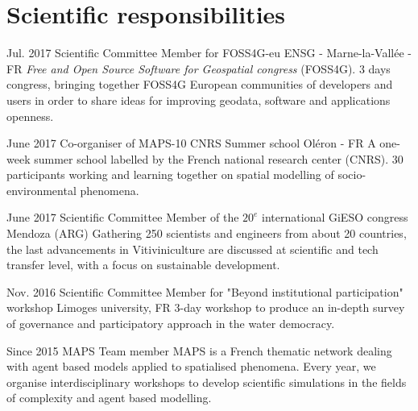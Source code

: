 \documentclass[]{cv-etienne}
\begin{document}
\section{Scientific responsibilities}
\begin{entrylist}
\entry
{Jul. 2017}
{Scientific Committee Member for FOSS4G-eu}
{ENSG - Marne-la-Vallée - FR}
{\emph{Free and Open Source Software for Geospatial congress} (FOSS4G). 3 days congress, bringing together FOSS4G European communities of developers and users in order to share ideas for improving geodata, software and applications openness.}
\end{entrylist}
\begin{entrylist}
\entry
{June 2017}
{Co-organiser of MAPS-10 CNRS Summer school}
{Oléron - FR}
{A one-week summer school labelled by the French national research center (CNRS). 30 participants working and learning together on spatial modelling of socio-environmental phenomena.}
\end{entrylist}
\begin{entrylist}
\entry
{June 2017}
{Scientific Committee Member of the $20^{e}$ international GiESO congress}
{Mendoza (ARG)}
{Gathering 250 scientists and engineers from about 20 countries, the last advancements in Vitiviniculture are discussed at scientific and tech transfer level, with a focus on sustainable development.}
\end{entrylist}
\begin{entrylist}
\entry
{Nov. 2016}
{Scientific Committee Member for "Beyond institutional participation" workshop}
{Limoges university, FR}
{3-day workshop to produce an in-depth survey of governance and participatory approach in the water democracy.}
\end{entrylist}
\begin{entrylist}
\entry
{Since 2015}
{MAPS Team member}
{}
{MAPS is a French thematic network dealing with agent based models applied to spatialised phenomena. Every year, we organise interdisciplinary workshops to develop scientific simulations in the fields of complexity and agent based modelling}.
\end{entrylist}
\end{document}

